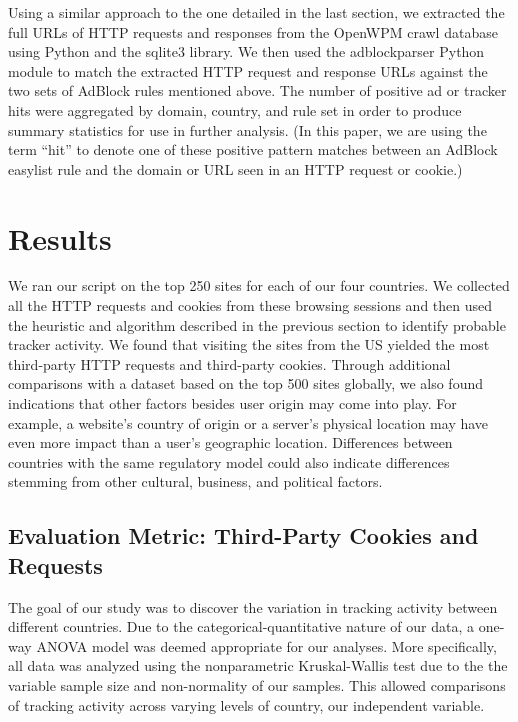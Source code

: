 \documentclass[conference]{IEEEtran}
\newcommand{\todo}[1]{}
\renewcommand{\todo}[1]{{\color{red} TODO: {#1}}}
\begin{document}
Using a similar approach to the one detailed in the last section, we extracted the full URLs of HTTP requests and responses from the OpenWPM crawl database using Python and the sqlite3 library. We then used the adblockparser  \cite{adblockparser} Python module to match the extracted HTTP request and response URLs against the two sets of AdBlock rules mentioned above. The number of positive ad or tracker hits were aggregated by domain, country, and rule set in order to produce summary statistics for use in further analysis. (In this paper, we are using the term ``hit'' to denote one of these positive pattern matches between an AdBlock easylist rule and the domain or URL seen in an HTTP request or cookie.)

\section{Results}
We ran our script on the top 250 sites for each of our four countries.  We collected all the HTTP requests and cookies from these browsing sessions and then used the heuristic and algorithm described in the previous section to identify probable tracker activity.  We found that visiting the sites from the US yielded the most third-party HTTP requests and third-party cookies. Through additional comparisons with a dataset based on the top 500 sites globally, we also found indications that other factors besides user origin may come into play. For example, a website's country of origin or a server's physical location may have even more impact than a user's geographic location. Differences between countries with the same regulatory model could also indicate differences stemming from other cultural, business, and political factors. 

\subsection{Evaluation Metric: Third-Party Cookies and Requests}
The goal of our study was to discover the variation in tracking activity between different countries. Due to the categorical-quantitative nature of our data, a one-way ANOVA model was deemed appropriate for our analyses. More specifically, all data was analyzed using the nonparametric Kruskal-Wallis test due to the the variable sample size and non-normality of our samples. This allowed comparisons of tracking activity across varying levels of country, our independent variable.
\end{document}
